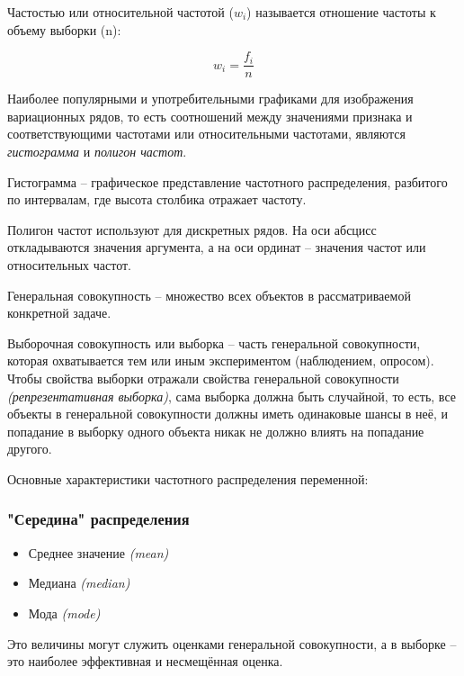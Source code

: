 Частостью или относительной частотой (\colorbox[rgb]{0.95, 0.95, 0.95}{$w_i$}) называется отношение частоты к объему выборки (\colorbox[rgb]{0.95, 0.95, 0.95}{n}):

\begin{equation}
	w_i = \frac{f_i}{n}
\end{equation}

Наиболее популярными и употребительными графиками для изображения вариационных рядов, то есть соотношений между значениями признака и соответствующими частотами или относительными частотами, являются \textit{гистограмма} и \textit{полигон частот}.

Гистограмма -- графическое представление частотного распределения, разбитого по интервалам, где высота столбика отражает частоту.

Полигон частот используют для дискретных рядов. На оси абсцисс откладываются значения аргумента, а на оси ординат -- значения частот или относительных частот.

Генеральная совокупность -- множество всех объектов в рассматриваемой конкретной задаче.

Выборочная совокупность или выборка -- часть генеральной совокупности, которая охватывается тем или иным экспериментом (наблюдением, опросом). Чтобы свойства выборки отражали свойства генеральной совокупности \textit{(репрезентативная выборка)}, сама выборка должна быть случайной, то есть, все объекты в генеральной совокупности должны иметь одинаковые шансы в неё, и попадание в выборку одного объекта никак не должно влиять на попадание другого.

Основные характеристики частотного распределения переменной:

\subsubsection{"Середина" \hspace*{0.1cm} распределения}

\begin{itemize}
	\item Среднее значение \textit{(mean)}
	\item Медиана \textit{(median)}
	\item Мода \textit{(mode)}
\end{itemize}

Это величины могут служить оценками генеральной совокупности, а в выборке -- это наиболее эффективная и несмещённая оценка.

